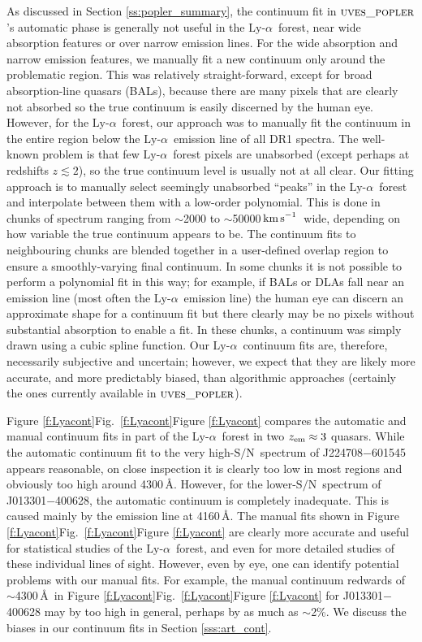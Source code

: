 \documentclass[fleqn,usenatbib,usedcolumn]{mnras}
\renewcommand{\la}{\lesssim} %
\newcommand{\Sref}[1]{Section \ref{#1}}
\newcommand{\Fref}[1]{\ifhmode \ifnum\spacefactor=1001 Figure \ref{#1}\else Fig.\ \ref{#1}\fi \else Figure \ref{#1}\fi}
\newcommand{\kms}{\ensuremath{\textrm{km\,s}^{-1}}}
\newcommand{\SN}{\ensuremath{\textrm{S/N}}}
\newcommand{\lya}{\ensuremath{\textrm{Ly-}\alpha}}
\newcommand{\zem}{\ensuremath{z_\textrm{\scriptsize em}}}
\newcommand{\popler}{\ensuremath{\textsc{uves\_popler}}}
\begin{document}
As discussed in \Sref{ss:popler_summary}, the continuum fit in \popler's automatic phase is generally not useful in the \lya\ forest, near wide absorption features or over narrow emission lines. For the wide absorption and narrow emission features, we manually fit a new continuum only around the problematic region. This was relatively straight-forward, except for broad absorption-line quasars (BALs), because there are many pixels that are clearly not absorbed so the true continuum is easily discerned by the human eye. However, for the \lya\ forest, our approach was to manually fit the continuum in the entire region below the \lya\ emission line of all DR1 spectra. The well-known problem is that few \lya\ forest pixels are unabsorbed  (except perhaps at redshifts $z\la2$), so the true continuum level is usually not at all clear. Our fitting approach is to manually select seemingly unabsorbed ``peaks'' in the \lya\ forest and interpolate between them with a low-order polynomial. This is done in chunks of spectrum ranging from $\sim$2000 to $\sim$50000\,\kms\ wide, depending on how variable the true continuum appears to be. The continuum fits to neighbouring chunks are blended together in a user-defined overlap region to ensure a smoothly-varying final continuum. In some chunks it is not possible to perform a polynomial fit in this way; for example, if BALs or DLAs fall near an emission line (most often the \lya\ emission line) the human eye can discern an approximate shape for a continuum fit but there clearly may be no pixels without substantial absorption to enable a fit. In these chunks, a continuum was simply drawn using a cubic spline function. Our \lya\ continuum fits are, therefore, necessarily subjective and uncertain; however, we expect that they are likely more accurate, and more predictably biased, than algorithmic approaches (certainly the ones currently available in \popler).

\Fref{f:Lyacont} compares the automatic and manual continuum fits in part of the \lya\ forest in two $\zem\approx3$ quasars. While the automatic continuum fit to the very high-\SN\ spectrum of J224708$-$601545 appears reasonable, on close inspection it is clearly too low in most regions and obviously too high around 4300\,\AA. However, for the lower-\SN\ spectrum of J013301$-$400628, the automatic continuum is completely inadequate. This is caused mainly by the emission line at 4160\,\AA. The manual fits shown in \Fref{f:Lyacont} are clearly more accurate and useful for statistical studies of the \lya\ forest, and even for more detailed studies of these individual lines of sight. However, even by eye, one can identify potential problems with our manual fits. For example, the manual continuum redwards of $\sim$4300\,\AA\ in \Fref{f:Lyacont} for J013301$-$400628 may by too high in general, perhaps by as much as $\sim$2\%. We discuss the biases in our continuum fits in \Sref{sss:art_cont}.
\end{document}
